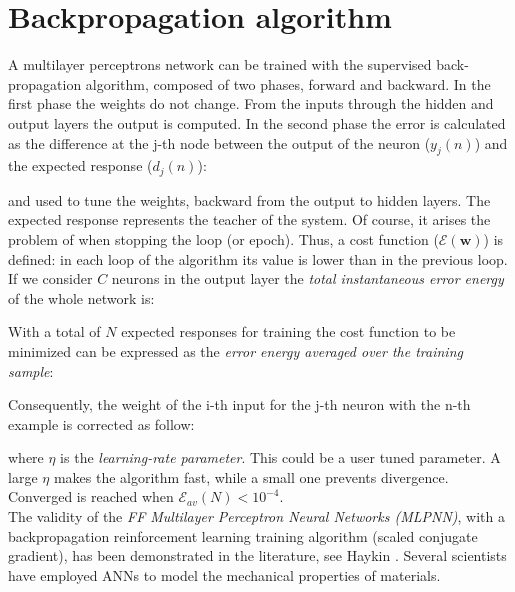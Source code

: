 
\section{Backpropagation algorithm}
\label{sec:backpropagationalgorithm}

A multilayer perceptrons network can be trained with the
supervised back-propagation algorithm, composed of two phases, forward and
backward.
In the first phase the weights do not change. 
From the inputs through the hidden
and output layers the output is computed.
In the second phase the error is calculated as the difference at the j-th
node between the output of the neuron ($y_j(n)$) and the expected response
($d_j(n)$):

and used to tune the weights, backward from the output to hidden
layers.
The expected response represents the teacher of the system.
Of course, it arises the problem of when stopping the loop (or epoch). 
Thus, a cost
function ($\mathscr{E}(\mathbf{w})$) is defined: 
in each loop of
the algorithm its value is lower than in the previous loop.
If we consider $C$ neurons in the output layer the 
\textit{total instantaneous error energy} of the whole network is:

With a total of $N$ expected
responses for training the cost function to be minimized can be expressed as the
\textit{error energy averaged over the training sample}:

Consequently, the weight of the i-th input for the j-th neuron with the n-th
example is corrected as follow:

where $\eta$ is the \textit{learning-rate parameter}.
This could be a user tuned parameter. 
A large $\eta$ makes the algorithm fast,
while a small one prevents divergence.
Converged is reached when $\mathscr{E}_{av}(N) < 10^{-4}$.\\
The validity of the \textit{FF Multilayer Perceptron Neural Networks
(MLPNN)}, with a backpropagation reinforcement learning 
training algorithm (scaled conjugate gradient), has been demonstrated in the 
literature, see Haykin \cite{RefWorks:158}. Several scientists 
\cite{RefWorks:161, RefWorks:166, RefWorks:167, RefWorks:168, RefWorks:169,
RefWorks:170, RefWorks:178, RefWorks:179} have employed \acs{ANNs} to model
the mechanical properties of materials.


